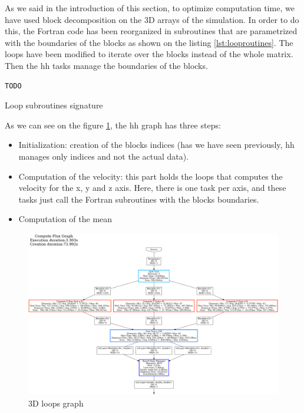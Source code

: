 As we said in the introduction of this section, to optimize computation time, we
have used block decomposition on the 3D arrays of the simulation. In order to do
this, the Fortran code has been reorganized in subroutines that are parametrized
with the boundaries of the blocks as shown on the listing
\ref{lst:looproutines}. The loops have been modified to iterate over the blocks
instead of the whole matrix. Then the \gls{hh} tasks manage the boundaries of
the blocks.

\begin{listing}[ht!]
\begin{verbatim}
TODO
\end{verbatim}
\caption{Loop subroutines signature}
\label{lst:looproutines}
\end{listing}

As we can see on the figure \ref{fig:loopsgraph}, the \gls{hh} graph has three
steps:

\begin{itemize}
  \item Initialization: creation of the blocks indices (has we have seen
    previously, \gls{hh} manages only indices and not the actual data).
  \item Computation of the velocity: this part holds the loops that computes the
    velocity for the x, y and z axis. Here, there is one task per axis, and
    these tasks just call the Fortran subroutines with the blocks boundaries.
  \item Computation of the mean
\end{itemize}

\begin{figure}[h!]
  \begin{center}
    \includegraphics[scale=0.2]{img/fds-loops/graph-61.png}
    \caption{3D loops graph}
    \label{fig:loopsgraph}
  \end{center}
\end{figure}

